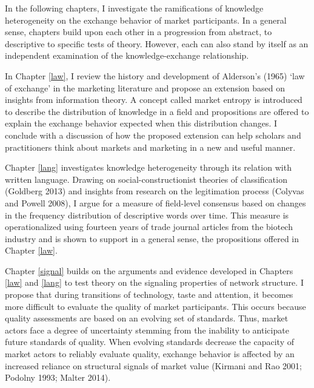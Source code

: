 In the following chapters, I investigate the ramifications of knowledge heterogeneity on the exchange behavior of market participants. In a general sense, chapters build upon each other in a progression from abstract, to descriptive to specific tests of theory. However, each can also stand by itself as an independent examination of the knowledge-exchange relationship. 

In Chapter \ref{law}, I review the history and development of Alderson's (1965) `law of exchange' in the marketing literature and propose an extension based on insights from information theory. A concept called market entropy is introduced to describe the distribution of knowledge in a field and propositions are offered to explain the exchange behavior expected when this distribution changes. I conclude with a discussion of how the proposed extension can help scholars and practitioners think about markets and marketing in a new and useful manner. 

Chapter \ref{lang} investigates knowledge heterogeneity through its relation with written language. Drawing on social-constructionist theories of classification (Goldberg 2013) and insights from research on the legitimation process (Colyvas and Powell 2008), I argue for a measure of field-level consensus based on changes in the frequency distribution of descriptive words over time. This measure is operationalized using fourteen years of trade journal articles from the biotech industry and is shown to support in a general sense, the propositions offered in Chapter \ref{law}. 

Chapter \ref{signal} builds on the arguments and evidence developed in Chapters \ref{law} and \ref{lang} to test theory on the signaling properties of network structure. I propose that during transitions of technology, taste and attention, it becomes more difficult to evaluate the quality of market participants. This occurs because quality assessments are based on an evolving set of standards. Thus, market actors face a degree of uncertainty stemming from the inability to anticipate future standards of quality. When evolving standards decrease the capacity of market actors to reliably evaluate quality, exchange behavior is affected by an increased reliance on structural signals of market value (Kirmani and Rao 2001; Podolny 1993; Malter 2014). 

